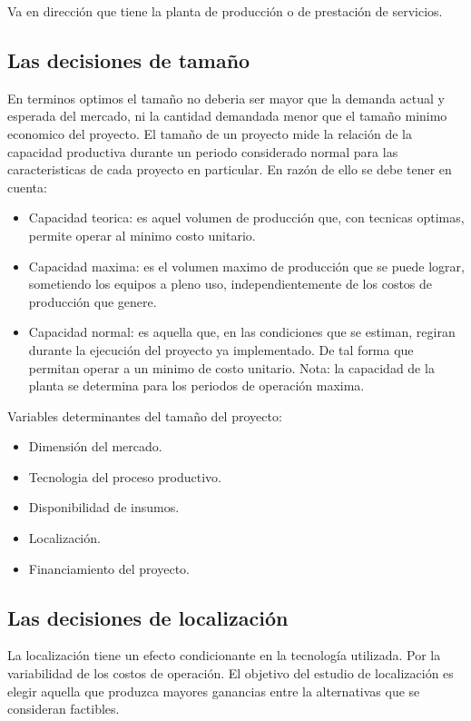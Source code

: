 \documentclass[a4paper, 11pt, oneside]{article}
\begin{document}
Va en dirección que tiene la planta de producción o de prestación de servicios.

\subsection{Las decisiones de tamaño}

En terminos optimos el tamaño no deberia ser mayor que la demanda actual y esperada del mercado, ni la cantidad
demandada menor que el tamaño minimo economico del proyecto. El tamaño de un proyecto mide la relación de la
capacidad productiva durante un periodo considerado normal para las caracteristicas de cada proyecto en particular.
En razón de ello se debe tener en cuenta:

\begin{itemize}
	\item Capacidad teorica: es aquel volumen de producción que, con tecnicas optimas, permite operar al minimo costo
	      unitario.
	\item Capacidad maxima: es el volumen maximo de producción que se puede lograr, sometiendo los equipos a pleno
	      uso, independientemente de los costos de producción que genere.
	\item Capacidad normal: es aquella que, en las condiciones que se estiman, regiran durante la ejecución del proyecto
	      ya implementado. De tal forma que permitan operar a un minimo de costo unitario. Nota: la capacidad de la planta
	      se determina para los periodos de operación maxima.
\end{itemize}

Variables determinantes del tamaño del proyecto:

\begin{itemize}
	\item Dimensión del mercado.
	\item Tecnologia del proceso productivo.
	\item Disponibilidad de insumos.
	\item Localización.
	\item Financiamiento del proyecto.
\end{itemize}

\subsection{Las decisiones de localización}

La localización tiene un efecto condicionante en la tecnología utilizada. Por la variabilidad de los costos de operación. El objetivo
del estudio de localización es elegir aquella que produzca mayores ganancias entre la alternativas que se consideran factibles.
\end{document}
